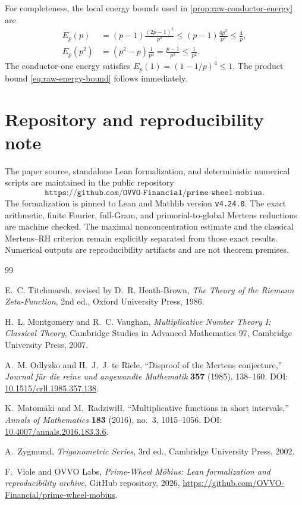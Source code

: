 \documentclass[11pt]{article}
\theoremstyle{definition}
\begin{document}
For completeness, the local energy bounds used in \cref{prop:raw-conductor-energy} are
\begin{align*}
E_p(p)
&=(p-1)\frac{(2p-1)^2}{p^4}
\le(p-1)\frac{4p^2}{p^4}
\le\frac4p,\\
E_p(p^2)
&=(p^2-p)\frac1{p^4}
=\frac{p-1}{p^3}
\le\frac1{p^2}.
\end{align*}
The conductor-one energy satisfies $E_p(1)=(1-1/p)^4\le1$.  The product bound \eqref{eq:raw-energy-bound} follows immediately.

\section{Repository and reproducibility note}

The paper source, standalone Lean formalization, and deterministic numerical scripts are maintained in the public repository
\[
\texttt{https://github.com/OVVO-Financial/prime-wheel-mobius}.
\]
The formalization is pinned to Lean and Mathlib version \texttt{v4.24.0}.  The exact arithmetic, finite Fourier, full-Gram, and primorial-to-global Mertens reductions are machine checked.  The maximal nonconcentration estimate and the classical Mertens--RH criterion remain explicitly separated from those exact results.  Numerical outputs are reproducibility artifacts and are not theorem premises.

\begin{thebibliography}{99}

E.~C. Titchmarsh, revised by D.~R. Heath-Brown,
\emph{The Theory of the Riemann Zeta-Function}, 2nd ed., Oxford University Press, 1986.

H.~L. Montgomery and R.~C. Vaughan,
\emph{Multiplicative Number Theory I: Classical Theory}, Cambridge Studies in Advanced Mathematics 97, Cambridge University Press, 2007.

A.~M. Odlyzko and H.~J.~J. te Riele,
``Disproof of the Mertens conjecture,''
\emph{Journal f\"ur die reine und angewandte Mathematik} \textbf{357} (1985), 138--160.
DOI: \href{https://doi.org/10.1515/crll.1985.357.138}{10.1515/crll.1985.357.138}.

K.~Matom\"aki and M.~Radziwi\l\l,
``Multiplicative functions in short intervals,''
\emph{Annals of Mathematics} \textbf{183} (2016), no.~3, 1015--1056.
DOI: \href{https://doi.org/10.4007/annals.2016.183.3.6}{10.4007/annals.2016.183.3.6}.

A.~Zygmund,
\emph{Trigonometric Series}, 3rd ed., Cambridge University Press, 2002.

F.~Viole and OVVO Labs,
\emph{Prime-Wheel M\"obius: Lean formalization and reproducibility archive},
GitHub repository, 2026,
\url{https://github.com/OVVO-Financial/prime-wheel-mobius}.

\end{thebibliography}
\end{document}
